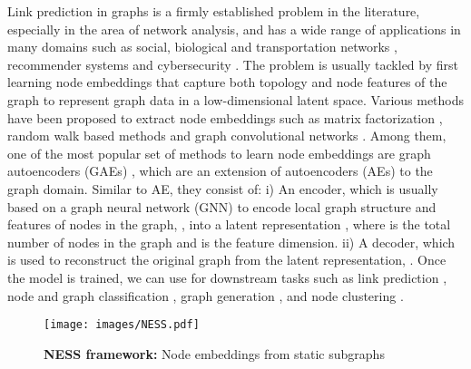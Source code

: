 \documentclass{article}
\begin{document}
Link prediction in graphs is a firmly established problem in the literature, especially in the area of network analysis, and has a wide range of applications in many domains such as social, biological and transportation networks \citep{zhang2020autosf, qi2006evaluation, chami2019hyperbolic}, recommender systems \citep{zhang2018link} and cybersecurity \citep{liben2003link}. The problem is usually tackled by first learning node embeddings that capture both topology and node features of the graph to represent graph data in a low-dimensional latent space. Various methods have been proposed to extract node embeddings such as matrix factorization \citep{ahmed2013distributed, cao2015grarep, katz1953new}, random walk based methods \citep{perozzi2014deepwalk, grover2016node2vec} and graph convolutional networks \citep{kipf2016semi, kipf2016variational,  hamilton2017inductive, chiang2019cluster}. Among them, one of the most popular set of methods to learn node embeddings are graph autoencoders (GAEs) \citep{kipf2016variational}, which are an extension of autoencoders (AEs) \citep{rumelhart1985learning} to the graph domain. Similar to AE, they consist of: i) An encoder, which is usually based on a graph neural network (GNN) to encode local graph structure and features of nodes in the graph, , into a latent representation , where  is the total number of nodes in the graph and  is the feature dimension. ii) A decoder, which is used to reconstruct the original graph from the latent representation, . Once the model is trained, we can use  for downstream tasks such as link prediction \citep{kipf2016variational, berg2017graph}, node and graph classification \citep{rong2019dropedge, kipf2016semi}, graph generation \citep{jin2018junction, simonovsky2018graphvae, samanta2020nevae}, and node clustering \citep{hasanzadeh2019semi, pan2018adversarially}.


\begin{figure*}[ht]
\vskip 0.2in
\begin{center}
\centerline{\texttt{[image: images/NESS.pdf]}}
\caption{\textbf{NESS framework:} Node embeddings from static subgraphs}\label{fig:subgraph_framework}
\end{center}
\vskip -0.2in
\end{figure*}
\end{document}

